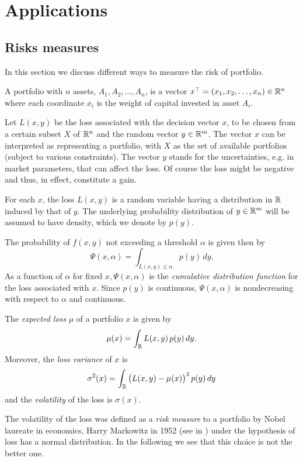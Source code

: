 \chapter{Applications} \label{chap:App}

\section{Risks measures}

In this section we discuss different ways to measure the risk of portfolio.


\begin{definition}
	A portfolio with $n$ assets, $A_1, A_2, \dots, A_n$, is a vector $x^\top = (x_1, x_2, \dots, x_n)\in \mathbb{R}^n$ where each coordinate $x_i$ is the weight of capital invested in asset $A_i$.
\end{definition}

Let $L(x,y)$ be the loss associated with the decision vector $x$, to be chosen from a certain subset $X$ of $\mathbb{R}^n$ and the random vector $y \in \mathbb{R}^m$. The vector $x$ can be interpreted as representing a portfolio, with $X$ as the set of available portfolios
(subject to various constraints). The vector $y$ stands for the uncertainties, e.g. in market parameters, that can affect the loss. Of course the loss might be negative and thus, in effect, constitute a gain.

For each $x$, the loss $L(x,y)$ is a random variable having a distribution in $\mathbb{R}$ induced by that of $y$. The underlying probability distribution of $y \in \mathbb{R}^m$ will be assumed to have density, which we denote by $p(y)$.

The probability of $f(x,y)$ not exceeding a threshold $\alpha$ is given then by
\[
	\Psi (x,\alpha) = \int_{L(x,y)\leq \alpha} p(y)\,dy.
\]
As a function of $\alpha$ for fixed $x, \Psi(x, \alpha)$ is the \textit{cumulative distribution function} for the loss associated with $x$. Since $p(y)$ is continuous, $\Psi(x, \alpha)$ is nondecreasing with respect to $\alpha$ and continuous.


The \textit{expected loss} $\mu$ of a portfolio $x$ is given by
\[
	\mu(x) = \int_{\mathbb{R}} L(x,y)\,p(y)\,dy.
\]
Moreover, the \textit{loss variance} of $x$ is
\[
	\sigma^2(x) = \int_{\mathbb{R}} \big(L(x,y)-\mu(x)\big)^2\,p(y)\,dy
\]
and the \textit{volatility} of the loss is $\sigma(x)$.

The volatility of the loss was defined as a \textit{risk measure} to a portfolio by Nobel laureate in economics, Harry Markowitz in 1952 (see in \cite{Markowitz1952}) under the hypothesis of loss has a normal distribution. In the following we see that this choice is not the better one.

